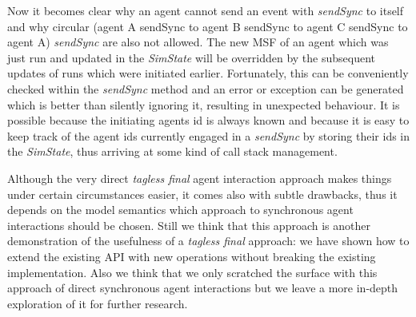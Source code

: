 Now it becomes clear why an agent cannot send an event with \textit{sendSync} to itself and why circular (agent A sendSync to agent B sendSync to agent C sendSync to agent A) \textit{sendSync} are also not allowed. The new MSF of an agent which was just run and updated in the \textit{SimState} will be overridden by the subsequent updates of runs which were initiated earlier. Fortunately, this can be conveniently checked within the \textit{sendSync} method and an error or exception can be generated which is better than silently ignoring it, resulting in unexpected behaviour. It is possible because the initiating agents id is always known and because it is easy to keep track of the agent ids currently engaged in a \textit{sendSync} by storing their ids in the \textit{SimState}, thus arriving at some kind of call stack management.

Although the very direct \textit{tagless final} agent interaction approach makes things under certain circumstances easier, it comes also with subtle drawbacks, thus it depends on the model semantics which approach to synchronous agent interactions should be chosen. Still we think that this approach is another demonstration of the usefulness of a \textit{tagless final} approach: we have shown how to extend the existing API with new operations without breaking the existing implementation. Also we think that we only scratched the surface with this approach of direct synchronous agent interactions but we leave a more in-depth exploration of it for further research.